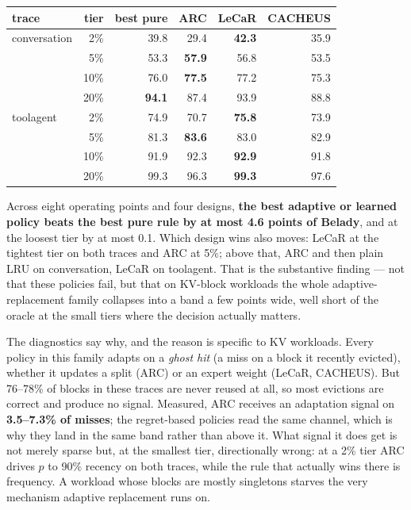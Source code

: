 \begin{center}\small
\begin{tabular}{@{}lrrrrr@{}}
\toprule
trace & tier & best pure & ARC & LeCaR & CACHEUS \\
\midrule
conversation & 2\%  & 39.8 & 29.4 & \textbf{42.3} & 35.9 \\
             & 5\%  & 53.3 & \textbf{57.9} & 56.8 & 53.5 \\
             & 10\% & 76.0 & \textbf{77.5} & 77.2 & 75.3 \\
             & 20\% & \textbf{94.1} & 87.4 & 93.9 & 88.8 \\
\midrule
toolagent    & 2\%  & 74.9 & 70.7 & \textbf{75.8} & 73.9 \\
             & 5\%  & 81.3 & \textbf{83.6} & 83.0 & 82.9 \\
             & 10\% & 91.9 & 92.3 & \textbf{92.9} & 91.8 \\
             & 20\% & 99.3 & 96.3 & \textbf{99.3} & 97.6 \\
\bottomrule
\end{tabular}
\end{center}

\medskip
\noindent Across eight operating points and four designs, \textbf{the best adaptive or learned policy
beats the best pure rule by at most 4.6 points of Belady}, and at the loosest tier by at most 0.1. Which
design wins also moves: LeCaR at the tightest tier on both traces and ARC at 5\%; above that, ARC and
then plain LRU on conversation, LeCaR on toolagent. That is the substantive finding --- not that these policies fail, but that on KV-block workloads
the whole adaptive-replacement family collapses into a band a few points wide, well short of the oracle
at the small tiers where the decision actually matters.

The diagnostics say why, and the reason is specific to KV workloads. Every policy in this family adapts
on a \emph{ghost hit} (a miss on a block it recently evicted), whether it updates a split (ARC) or
an expert weight (LeCaR, CACHEUS). But 76--78\% of blocks in these traces are never reused at all, so
most evictions are correct and produce no signal. Measured, ARC receives an adaptation signal on
\textbf{3.5--7.3\% of misses}; the regret-based policies read the same channel, which is why they land
in the same band rather than above it. What signal it does get is not merely sparse but, at
the smallest tier, directionally wrong: at a 2\% tier ARC drives $p$ to 90\% recency on both traces, while
the rule that actually wins there is frequency. A workload whose blocks are mostly singletons starves the
very mechanism adaptive replacement runs on.


